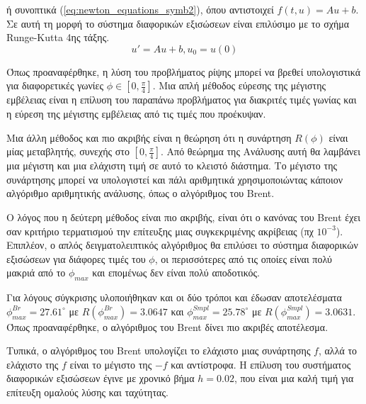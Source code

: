 \documentclass[assignment4.tex]{subfiles}
\begin{document}
ή συνοπτικά (\ref{eq:newton_equations_symb2}), όπου αντιστοιχεί $f(t, u)=Au + b$. Σε αυτή τη μορφή το σύστημα διαφορικών εξισώσεων είναι επιλύσιμο με το σχήμα \textlatin{Runge-Kutta} 4ης τάξης.
\begin{equation}
u' = Au + b, u_0=u(0)
\label{eq:newton_equations_symb2}
\end{equation}

Όπως προαναφέρθηκε, η λύση του προβλήματος ρίψης μπορεί να βρεθεί υπολογιστικά για διαφορετικές γωνίες $\phi\in[0, \frac{\pi}{4}]$. Μια απλή μέθοδος εύρεσης της μέγιστης εμβέλειας είναι η επίλυση του παραπάνω προβλήματος για διακριτές τιμές γωνίας και η εύρεση της μέγιστης εμβέλειας από τις τιμές που προέκυψαν.

Μια άλλη μέθοδος και πιο ακριβής είναι η θεώρηση ότι η συνάρτηση $R(\phi)$ είναι μίας μεταβλητής, συνεχής στο $[0, \frac{\pi}{4}]$. Από θεώρημα της Ανάλυσης αυτή θα λαμβάνει μια μέγιστη και μια ελάχιστη τιμή σε αυτό το κλειστό διάστημα. Το μέγιστο της συνάρτησης μπορεί να υπολογιστεί και πάλι αριθμητικά χρησιμοποιώντας κάποιον αλγόριθμο αριθμητικής ανάλυσης, όπως ο αλγόριθμος του \textlatin{Brent}. 

Ο λόγος που η δεύτερη μέθοδος είναι πιο ακριβής, είναι ότι ο κανόνας του \textlatin{Brent} έχει σαν κριτήριο τερματισμού την επίτευξης μιας συγκεκριμένης ακρίβειας (πχ $10^{-3}$). Επιπλέον, ο απλός δειγματολειπτικός αλγόριθμος θα επιλύσει το σύστημα διαφορικών εξισώσεων για διάφορες τιμές του $\phi$, οι περισσότερες από τις οποίες είναι πολύ μακριά από το $\phi_{max}$ και επομένως δεν είναι πολύ αποδοτικός. 

Για λόγους σύγκρισης υλοποιήθηκαν και οι δύο τρόποι και έδωσαν αποτελέσματα $\phi^{Br}_{max}=27.61^\circ$ με $R(\phi^{Br}_{max})=3.0647$ και $\phi^{Smpl}_{max}=25.78^\circ$ με $R(\phi^{Smpl}_{max})=3.0631$. Όπως προαναφέρθηκε, ο αλγόριθμος του \textlatin{Brent} δίνει πιο ακριβές αποτέλεσμα.

Τυπικά, ο αλγόριθμος του \textlatin{Brent} υπολογίζει το ελάχιστο μιας συνάρτησης $f$, αλλά το ελάχιστο της $f$ είναι το μέγιστο της $-f$ και αντίστροφα. Η επίλυση του συστήματος διαφορικών εξισώσεων έγινε με χρονικό βήμα $h=0.02$, που είναι μια καλή τιμή για επίτευξη ομαλούς λύσης και ταχύτητας.
\end{document}
